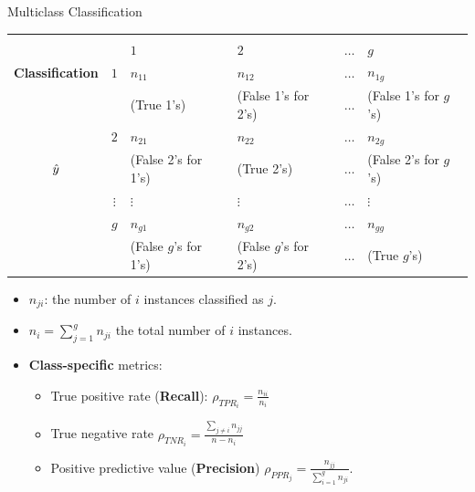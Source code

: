 \documentclass[11pt,compress,t,notes=noshow, xcolor=table]{beamer}
\begin{document}
\begin{frame}{Multiclass Classification}
	\small{
		\begin{center}
			\tiny
			\begin{tabular}{cc|>{\centering\arraybackslash}p{8em}>{\centering\arraybackslash}p{8em}>{\centering\arraybackslash}p{5em}>{\centering\arraybackslash}p{8em}}
				& & \multicolumn{4}{c}{\bfseries True Class $y$} \\
				& & $1$ & $2$ & $\ldots$ & $g$  \\
				\hline
				\bfseries Classification     & $1$ & $n_{11}$  &  $n_{12}$  & $\ldots$ &  $n_{1g}$ \\
				& & (True 1's) & (False 1's for 2's) & $\ldots$ &  (False 1's for $g$'s)  \\
				& $2$ &  $n_{21}$  &  $n_{22}$  & $\ldots$ & $n_{2g}$  \\
				$\hat{y}$ & & (False 2's for 1's) & (True 2's) & $\ldots$ &  (False 2's for $g$'s)  \\
				& $\vdots$ & $\vdots$ & $\vdots$ & $\ldots$ & $\vdots$ \\
				& $g$ & $n_{g1}$ & $n_{g2}$  & $\ldots$ &  $n_{gg}$\\
				& & (False $g$'s for 1's) & (False $g$'s for 2's) & $\ldots$ &  (True $g$'s)  \\
			\end{tabular}
		\end{center}
		
		\begin{itemize}
			\item $n_{ji}$: the number of $i$ instances classified as $j$.

            \item $n_i = \sum_{j=1}^g n_{ji}$ the total number of $i$ instances.

            \item \textbf{Class-specific} metrics:
                \begin{itemize}
                    \small
                    
                    \item True positive rate (\textbf{Recall}): $\rho_{TPR_i} = \frac{n_{ii}}{n_i}$
    
                    \item True negative rate $\rho_{TNR_i} = \frac{\sum_{j\neq i}n_{jj}}{n-n_i}$ 
    
                    \item Positive predictive value (\textbf{Precision}) $\rho_{PPR_j} = \frac{n_{jj}}{\sum_{i=1}^g n_{ji}}$.
                    
                \end{itemize}

		\end{itemize}
	}
\end{frame}
\end{document}
